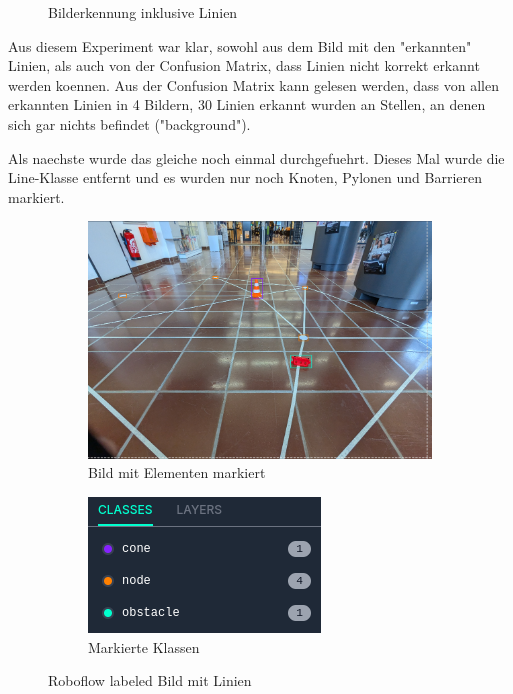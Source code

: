 \begin{figure}[H]
\caption{Bilderkennung inklusive Linien}
\label{fig:recognition-with-lines}
\end{figure}

Aus diesem Experiment war klar, sowohl aus dem Bild mit den "erkannten" Linien, als auch von der Confusion Matrix, dass Linien nicht korrekt erkannt werden koennen.
Aus der Confusion Matrix kann gelesen werden, dass von allen erkannten Linien in 4 Bildern, 30 Linien erkannt wurden an Stellen, an denen sich gar nichts befindet ("background").

Als naechste wurde das gleiche noch einmal durchgefuehrt. Dieses Mal wurde die Line-Klasse entfernt und es wurden nur noch Knoten, Pylonen und Barrieren markiert.

\begin{figure}[H]
\begin{subfigure}{0.55\textwidth}
\includegraphics[width=0.95\linewidth]{assets/informatik-prototyp/yolo/labeled-image.png} 
\caption{Bild mit Elementen markiert}
\label{fig:labeled-image}
\end{subfigure}
\begin{subfigure}{0.4\textwidth}
\includegraphics[width=0.95\linewidth]{assets/informatik-prototyp/yolo/labeled-classes.png} 
\caption{Markierte Klassen}
\label{fig:line-classes}
\end{subfigure}

\caption{Roboflow labeled Bild mit Linien}
\label{fig:labeling-with-lines}
\end{figure}

